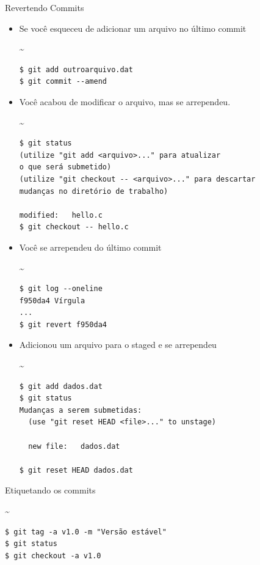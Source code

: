 \begin{frame}{Revertendo Commits}
\begin{itemize}
\item Se você esqueceu de adicionar um arquivo no último commit
\begin{terminal}{\~}
\begin{Verbatim}[fontseries=b]
$ git add outroarquivo.dat
$ git commit --amend
\end{Verbatim}
\end{terminal}
\item Você acabou de modificar o arquivo, mas se arrependeu.  	
\begin{terminal}{\~}
\begin{Verbatim}[fontseries=b]
$ git status  
(utilize "git add <arquivo>..." para atualizar 
o que será submetido)
(utilize "git checkout -- <arquivo>..." para descartar
mudanças no diretório de trabalho)

modified:   hello.c
$ git checkout -- hello.c
\end{Verbatim}
\end{terminal}
\item Você se arrependeu do último commit  	
\begin{terminal}{\~}
\begin{Verbatim}[fontseries=b]
$ git log --oneline
f950da4 Vírgula
...
$ git revert f950da4 
\end{Verbatim}
\end{terminal}
\item Adicionou um arquivo para o staged e se arrependeu
\begin{terminal}{\~}
\begin{Verbatim}[fontseries=b]
$ git add dados.dat
$ git status
Mudanças a serem submetidas:
  (use "git reset HEAD <file>..." to unstage)
  
  new file:   dados.dat
  	
$ git reset HEAD dados.dat
\end{Verbatim}
\end{terminal}
\end{itemize}	
\end{frame}
	
\begin{frame}[fragile]{Etiquetando os commits}
\begin{terminal}{\~}
\begin{Verbatim}[fontseries=b]
$ git tag -a v1.0 -m "Versão estável"
$ git status 
$ git checkout -a v1.0
\end{Verbatim}
\end{terminal}
\end{frame}	

